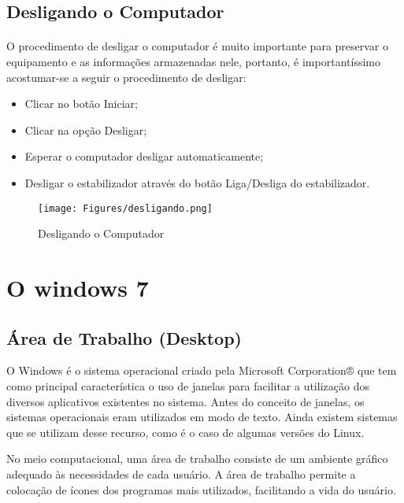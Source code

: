\documentclass[12pt]{article}
\begin{document}
\subsection{Desligando o Computador}
\paragraph{} O procedimento de desligar o computador é muito importante para preservar o equipamento e as informações armazenadas nele, portanto, é importantíssimo acostumar-se a seguir o procedimento de desligar:\\

\begin{itemize}
	\item Clicar no botão Iniciar;
	
	\item Clicar na opção Desligar; 
	
	\item Esperar o computador desligar automaticamente; 
	
	\item Desligar o estabilizador através do botão Liga/Desliga do estabilizador.
\end{itemize}

\begin{figure}[!hb]
	\centering	
	\texttt{[image: Figures/desligando.png]}
	\caption{Desligando o Computador}
	\label{fig:desligando}
\end{figure}

\newpage

\section{O windows 7}
\subsection{Área de Trabalho (Desktop)}

O Windows é o sistema operacional criado pela Microsoft Corporation® que tem como principal característica o uso de janelas para facilitar a utilização dos diversos aplicativos existentes no sistema. Antes do conceito de janelas, os sistemas operacionais eram utilizados em modo de texto. Ainda existem sistemas que se utilizam desse recurso, como é o caso de algumas versões do Linux.

No meio computacional, uma área de trabalho consiste de um ambiente gráfico adequado às necessidades de cada usuário. A área de trabalho permite a colocação de ícones dos programas mais utilizados, facilitando a vida do usuário.\\
\end{document}
